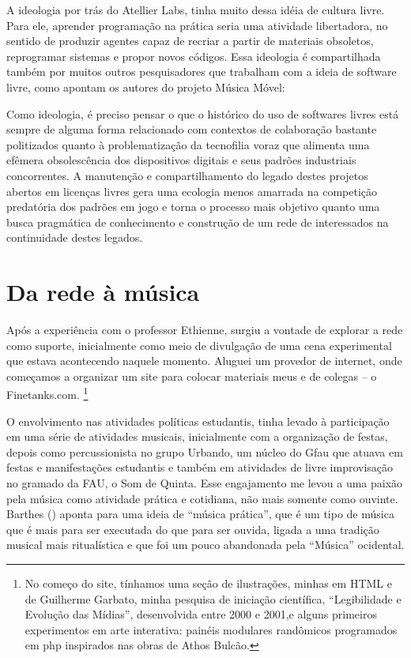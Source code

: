 A ideologia por trás do Atellier Labs, tinha muito dessa idéia de cultura livre. Para ele, aprender programação na prática seria uma atividade libertadora, no sentido de produzir agentes capaz de recriar a partir de materiais obsoletos, reprogramar sistemas e propor novos códigos. Essa ideologia é compartilhada também por muitos outros pesquisadores que trabalham com a ideia de software livre, como apontam os autores do projeto Música Móvel:

\begin{citacao}
Como ideologia, é preciso pensar o que o histórico do uso de softwares livres está sempre de alguma forma relacionado com contextos de colaboração bastante politizados quanto à problematização da tecnofilia voraz que alimenta uma efêmera obsolescência dos dispositivos digitais e seus padrões industriais concorrentes. A manutenção e compartilhamento do legado destes projetos abertos em licenças livres gera uma ecologia menos amarrada na competição predatória dos padrões em jogo e torna o processo mais objetivo quanto uma busca pragmática de conhecimento e construção de um rede de interessados na continuidade destes legados.\cite{Rohde2014}
\end{citacao}



\section{Da rede à música}
Após a experiência com o professor Ethienne, surgiu a vontade de explorar a rede como suporte, inicialmente como meio de divulgação de uma cena experimental que estava acontecendo naquele momento. Aluguei um provedor de internet, onde começamos a organizar um site para colocar materiais meus e de colegas -- o Finetanks.com. \footnote{No começo do site, tínhamos uma seção de ilustrações, minhas em HTML e de Guilherme Garbato, minha pesquisa de iniciação científica, ``Legibilidade e Evolução das Mídias'', desenvolvida entre 2000 e 2001,e alguns primeiros experimentos em arte interativa: painéis modulares randômicos programados em php inspirados nas obras de Athos Bulcão.}


O envolvimento nas atividades políticas estudantis, tinha levado à participação em uma série de atividades musicais, inicialmente com a organização de festas, depois como percussionista no grupo Urbando, um núcleo do Gfau que atuava em festas e manifestações estudantis e também em atividades de livre improvisação no gramado da FAU, o Som de Quinta. Esse engajamento me levou a uma paixão pela música como atividade prática e cotidiana, não mais somente como ouvinte. Barthes (\citeyear{Barthes1978}) aponta para uma ideia de ``música prática'', que é um tipo de música que é mais para ser executada do que para ser ouvida, ligada a uma tradição musical mais ritualística e que foi um pouco abandonada pela ``Música'' ocidental. 

